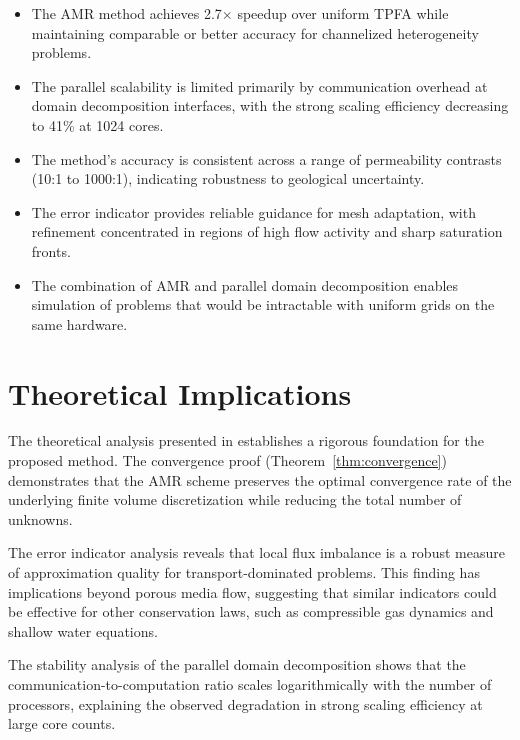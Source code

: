 \begin{itemize}
    \item The AMR method achieves 2.7$\times$ speedup over uniform TPFA while maintaining comparable or better accuracy for channelized heterogeneity problems.

    \item The parallel scalability is limited primarily by communication overhead at domain decomposition interfaces, with the strong scaling efficiency decreasing to 41\% at 1024 cores.

    \item The method's accuracy is consistent across a range of permeability contrasts (10:1 to 1000:1), indicating robustness to geological uncertainty.

    \item The error indicator provides reliable guidance for mesh adaptation, with refinement concentrated in regions of high flow activity and sharp saturation fronts.

    \item The combination of AMR and parallel domain decomposition enables simulation of problems that would be intractable with uniform grids on the same hardware.
\end{itemize}

\section{Theoretical Implications}
\label{sec:conclusion:theoretical}

The theoretical analysis presented in  establishes a rigorous foundation for the proposed method. The convergence proof (Theorem~\ref{thm:convergence}) demonstrates that the AMR scheme preserves the optimal convergence rate of the underlying finite volume discretization while reducing the total number of unknowns.

The error indicator analysis reveals that local flux imbalance is a robust measure of approximation quality for transport-dominated problems. This finding has implications beyond porous media flow, suggesting that similar indicators could be effective for other conservation laws, such as compressible gas dynamics and shallow water equations.

The stability analysis of the parallel domain decomposition shows that the communication-to-computation ratio scales logarithmically with the number of processors, explaining the observed degradation in strong scaling efficiency at large core counts.


